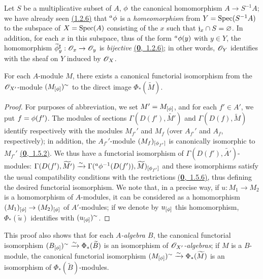 \begin{exm}[1.6.2]
\label{exm-1.1.6.2}
Let $S$ be a multiplicative subset of $A$, $\phi$ the canonical homomorphism $A\to S^{-1}A$;
we have already seen \hyperref[cor-1.1.2.6]{(1.2.6)} that ${}^a\phi$ is a {\em homeomorphism} from
$Y={\mathop{\mathrm{Spec}}\nolimits}(S^{-1}A)$ to the subspace of $X={\mathop{\mathrm{Spec}}\nolimits}(A)$ consisting of the $x$ such that
$\mathfrak{j}_x\cap S=\varnothing$. In addition, for each $x$ in this subspace, thus of the form
${}^a\phi(y)$ with $y\in Y$, the homomorphism $\widetilde{\phi}_y^\sharp:\mathscr{O}_x\to\mathscr{O}_y$ is
{\em bijective} \hyperref[env-0.1.2.6]{(\textbf{0},~1.2.6)}; in other words, $\mathscr{O}_Y$ identifies with the sheaf on $Y$
induced by $\mathscr{O}_X$.
\end{exm}

\begin{prop}[1.6.3]
\label{prop-1.1.6.3}
For each $A$-module $M$, there exists a canonical functorial isomorphism from the
$\mathscr{O}_{X'}$-module $(M_{[\phi]})^\sim$ to the direct image $\Phi_*(\widetilde{M})$.
\end{prop}

\begin{proof}
\label{proof-prop-1.1.6.3}
For purposes of abbreviation, we set $M'=M_{[\phi]}$, and for each $f'\in A'$, we put
$f=\phi(f')$. The modules of sections $\Gamma(D(f'),\widetilde{M'})$ and
$\Gamma(D(f),\widetilde{M})$ identify respectively with the modules $M_{f'}'$ and $M_f$
(over $A_{f'}'$ and $A_f$, respectively); in addition, the $A_{f'}'$-module
$(M_f)_{[\phi_{f'}]}$ is canonically isomorphic to $M_{f'}'$ \hyperref[env-0.1.5.2]{(\textbf{0},~1.5.2)}. We thus have
a functorial isomorphism of $\Gamma(D(f'),\widetilde{A'})$-modules:
$\Gamma(D(f'),\widetilde{M'})
\xrightarrow{\sim}\Gamma({}^a\phi^{-1}(D(f')),\widetilde{M})_{[\phi_{f'}]}$
and these isomorphisms satisfy the usual compatibility conditions with the restrictions
\hyperref[env-0.1.5.6]{(\textbf{0},~1.5.6)}, thus defining the desired functorial isomorphism. We note that, in a
precise way, if $u:M_1\to M_2$ is a homomorphism of $A$-modules, it can be considered as a
homomorphism $(M_1)_{[\phi]}\to(M_2)_{[\phi]}$ of $A'$-modules; if we denote by
$u_{[\phi]}$ this homomorphism, $\Phi_*(\widetilde{u})$ identifies with
$(u_{[\phi]})^\sim$.
\end{proof}

This proof also shows that for each {\em $A$-algebra $B$}, the canonical functorial
isomorphism
$(B_{[\phi]})^\sim\xrightarrow{\sim}\Phi_*(\widetilde{B})$ is an isomorphism of
{\em $\mathscr{O}_{X'}$-algebras}; if $M$ is a $B$-module, the canonical functorial isomorphism
$(M_{[\phi]})^\sim\xrightarrow{\sim}\Phi_*(\widetilde{M})$ is an isomorphism of
$\Phi_*(\widetilde{B})$-modules.


